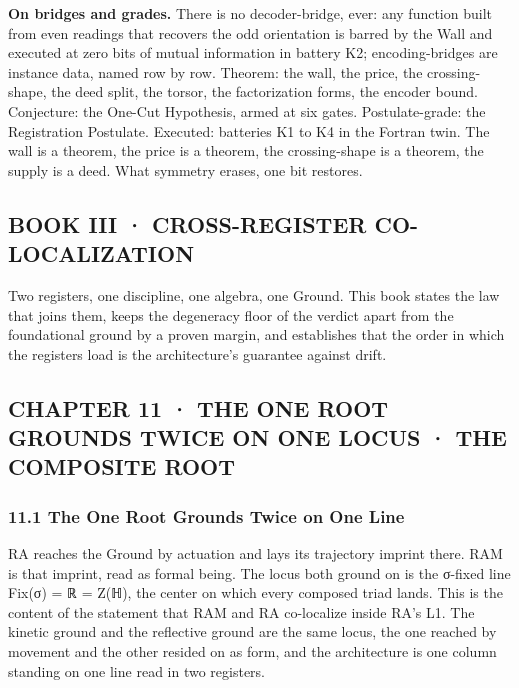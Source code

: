 \documentclass[10pt,twocolumn]{article}
\begin{document}
\textbf{On bridges and grades.} There is no decoder-bridge, ever: any
function built from even readings that recovers the odd orientation is
barred by the Wall and executed at zero bits of mutual information in
battery K2; encoding-bridges are instance data, named row by row.
Theorem: the wall, the price, the crossing-shape, the deed split, the
torsor, the factorization forms, the encoder bound. Conjecture: the
One-Cut Hypothesis, armed at six gates. Postulate-grade: the
Registration Postulate. Executed: batteries K1 to K4 in the Fortran
twin. The wall is a theorem, the price is a theorem, the crossing-shape
is a theorem, the supply is a deed. What symmetry erases, one bit
restores.

\hypertarget{book-iii-cross-register-co-localization}{%
\subsection{BOOK III · CROSS-REGISTER
CO-LOCALIZATION}\label{book-iii-cross-register-co-localization}}

Two registers, one discipline, one algebra, one Ground. This book states
the law that joins them, keeps the degeneracy floor of the verdict apart
from the foundational ground by a proven margin, and establishes that
the order in which the registers load is the architecture's guarantee
against drift.

\hypertarget{chapter-11-the-one-root-grounds-twice-on-one-locus-the-composite-root}{%
\subsection{CHAPTER 11 · THE ONE ROOT GROUNDS TWICE ON ONE LOCUS · THE
COMPOSITE
ROOT}\label{chapter-11-the-one-root-grounds-twice-on-one-locus-the-composite-root}}

\hypertarget{the-one-root-grounds-twice-on-one-line}{%
\subsubsection{11.1 The One Root Grounds Twice on One
Line}\label{the-one-root-grounds-twice-on-one-line}}

RA reaches the Ground by actuation and lays its trajectory imprint
there. RAM is that imprint, read as formal being. The locus both ground
on is the σ-fixed line Fix(σ) = ℝ = Z(ℍ), the center on which every
composed triad lands. This is the content of the statement that RAM and
RA co-localize inside RA's L1. The kinetic ground and the reflective
ground are the same locus, the one reached by movement and the other
resided on as form, and the architecture is one column standing on one
line read in two registers.
\end{document}
